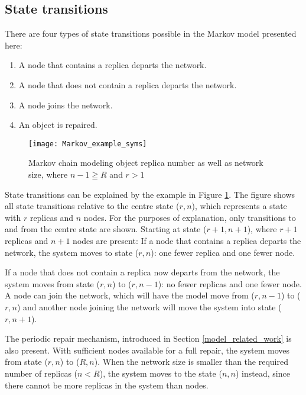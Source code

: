 \subsection{State transitions}

There are four types of state transitions possible in the Markov model presented here:
%
\begin{enumerate}
\item A node that contains a replica departs the network.
\item A node that does not contain a replica departs the network.
\item A node joins the network.
\item An object is repaired.
\end{enumerate}


\begin{figure}[htbp]
 \centering
 \texttt{[image: Markov\_example\_syms]}
 \caption{Markov chain modeling object replica number as well as network size, where $n-1\geqq R$ and $r > 1$}
 \label{fig_markov_example_syms}
\end{figure}

State transitions can be explained by the example in Figure \ref{fig_markov_example_syms}. The figure shows all state transitions relative to the centre state ($r,n$), which represents a state with $r$ replicas and $n$ nodes. For the purposes of explanation, only transitions to and from the centre state are shown. Starting at state ($r+1,n+1$), where $r+1$ replicas and $n+1$ nodes are present: If a node that contains a replica departs the network, the system moves to state ($r,n$): one fewer replica and one fewer node.

If a node that does not contain a replica now departs from the network, the system moves from state ($r,n$) to ($r,n-1$): no fewer replicas and one fewer node. A node can join the network, which will have the model move from ($r,n-1$) to ($r,n$) and another node joining the network will move the system into state ($r,n+1$).

The periodic repair mechanism, introduced in Section \ref{model_related_work} is also present. With sufficient nodes available for a full repair, the system moves from state ($r,n$) to ($R,n$). When the network size is smaller than the required number of replicas ($n<R$), the system moves to the state ($n,n$) instead, since there cannot be more replicas in the system than nodes.

